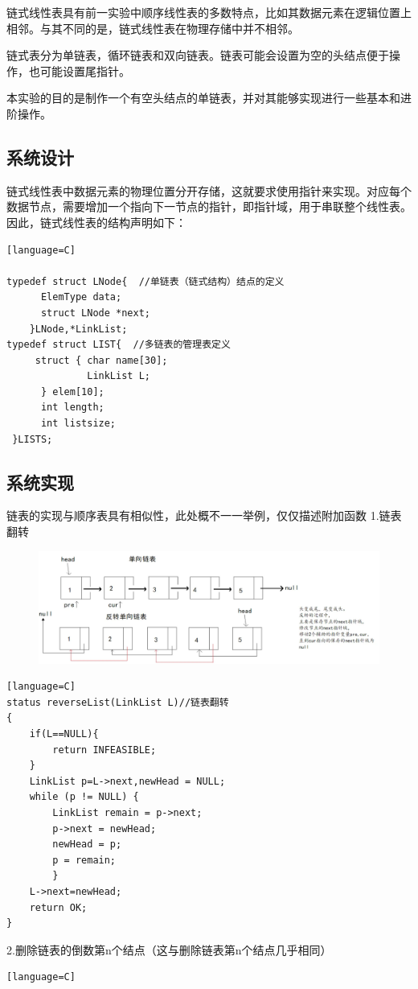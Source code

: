 \documentclass[supercite]{Experimental_Report}
\theoremstyle{definition}
\begin{document}
\begin{sloppypar}
链式线性表具有前一实验中顺序线性表的多数特点，比如其数据元素在逻辑位置上相邻。与其不同的是，链式线性表在物理存储中并不相邻。

链式表分为单链表，循环链表和双向链表。链表可能会设置为空的头结点便于操作，也可能设置尾指针。

本实验的目的是制作一个有空头结点的单链表，并对其能够实现进行一些基本和进阶操作。

\subsection{系统设计}

链式线性表中数据元素的物理位置分开存储，这就要求使用指针来实现。对应每个数据节点，需要增加一个指向下一节点的指针，即指针域，用于串联整个线性表。因此，链式线性表的结构声明如下：

\begin{lstlisting}[breaklines][language=C]

typedef struct LNode{  //单链表（链式结构）结点的定义
      ElemType data;
      struct LNode *next;
    }LNode,*LinkList;
typedef struct LIST{  //多链表的管理表定义
     struct { char name[30];
     		  LinkList L;	
      } elem[10];
      int length;
      int listsize;
 }LISTS;

\end{lstlisting}

\subsection{系统实现}
链表的实现与顺序表具有相似性，此处概不一一举例，仅仅描述附加函数
1.链表翻转
\begin{figure}[H]
	\includegraphics[width=12cm]{pic2//fanzhuan.png}
\end{figure} 
\begin{lstlisting}[breaklines][language=C]
status reverseList(LinkList L)//链表翻转
{
	if(L==NULL){
        return INFEASIBLE;
	}
	LinkList p=L->next,newHead = NULL;
    while (p != NULL) {
        LinkList remain = p->next;
        p->next = newHead;
        newHead = p;
        p = remain;
        }
    L->next=newHead;
    return OK;
}
\end{lstlisting}
2.删除链表的倒数第n个结点（这与删除链表第n个结点几乎相同）
\begin{lstlisting}[breaklines][language=C]


\end{lstlisting}
\end{sloppypar}
\end{document}
